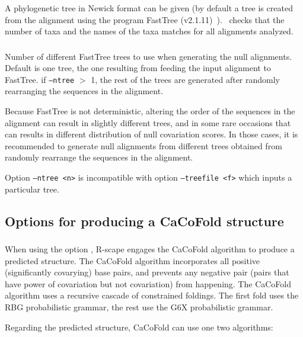 \subsubsection{} A phylogenetic tree in Newick format can be given (by default a tree is created 
from the alignment using the program FastTree (v2.1.11)~\citep{Price10}).  \rscape\ checks that the  number of taxa and the names
of the taxa matches for all alignments analyzed.

\subsubsection{} Number of different FastTree trees to use when generating the null alignments. Default is one tree, the one resulting from feeding the input alignment to FastTree. if \texttt{--ntree} $>$ 1, the rest of the trees are generated after randomly rearranging the sequences in the alignment.

\noindent
Because FastTree is not deterministic, altering the order of the sequences in the alignment can result in slightly different trees, and in some rare occasions that can results in different distribution of null covariation scores. In those cases, it is recommended to generate null alignments from different trees obtained from randomly rearrange the sequences in the alignment.

\noindent
Option \texttt{--ntree <n>} is incompatible with option \texttt{--treefile <f>} which inputs a particular tree.


\subsection{Options for producing a CaCoFold structure}

\subsubsection{}  
When using the option , R-scape engages the CaCoFold
algorithm to produce a predicted structure. The CaCoFold algorithm
incorporates all positive (significantly covarying) base pairs, and
prevents any negative pair (pairs that have power of covariation but
not covariation) from happening. The CaCoFold algorithm uses a
recursive cascade of constrained foldings. The first fold uses the RBG probabilistic grammar, the rest use the G6X probabilistic grammar.

\noindent
Regarding the predicted structure, CaCoFold can use one two algorithms:

